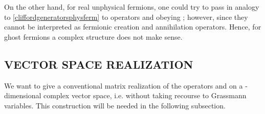 \documentclass[a4paper,10pt]{article}
\begin{document}
On the other hand, for real unphysical fermions, one could try to pass in analogy to 
\eqref{cliffordgeneratorsphysferm} to operators \coordHE{} and 
\coordHE{} obeying \coordHE{}; however, since 
\coordHE{} they cannot be interpreted as fermionic creation and annihilation 
operators. Hence, for ghost fermions a complex structure does not make sense.

\subsection{VECTOR SPACE REALIZATION}

We want to give a conventional matrix realization of the operators  \coordHE{} and 
\coordHE{} on a \coordHE{}-dimensional complex vector space, i.e. without taking recourse 
to Grassmann variables. This construction will be needed in the following subsection.
\end{document}
